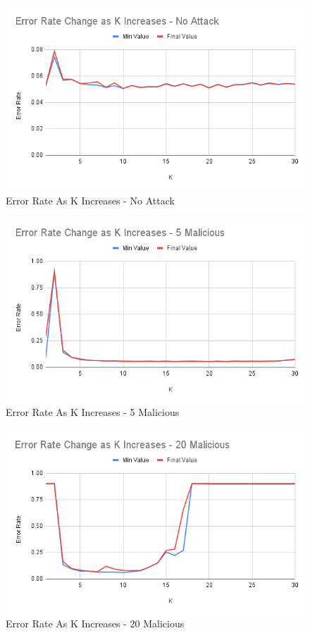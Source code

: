\begin{figure}[htbp]
	\centering
    \includegraphics[scale=0.5]{my_agg/graphs/k_elbow_0.png}
	\caption{Error Rate As K Increases - No Attack}
	\label{fig:k_elbow_0}
\end{figure}

\begin{figure}[htbp]
	\centering
    \includegraphics[scale=0.5]{my_agg/graphs/k_elbow_5.png}
	\caption{Error Rate As K Increases - 5 Malicious}
	\label{fig:k_elbow_5}
\end{figure}

\begin{figure}[htbp]
	\centering
    \includegraphics[scale=0.5]{my_agg/graphs/k_elbow_20.png}
	\caption{Error Rate As K Increases - 20 Malicious}
	\label{fig:k_elbow_20}
\end{figure}

